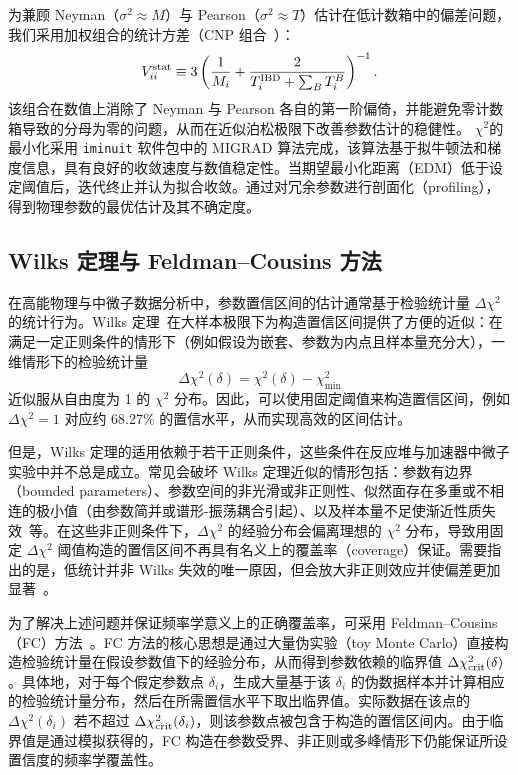 为兼顾 Neyman（$\sigma^2\approx M$）与 Pearson（$\sigma^2\approx T$）估计在低计数箱中的偏差问题，我们采用加权组合的统计方差（CNP 组合~\citep{JI2020163677}）：  
\begin{equation}  
V_{ii}^{\rm stat} \equiv 3\left(\frac{1}{M_i}+\frac{2}{T_i^{\rm IBD}+\sum_B T_i^{B}}\right)^{-1}.  
\label{eq:Chisq:CNP}  
\end{equation}  
该组合在数值上消除了 Neyman 与 Pearson 各自的第一阶偏倚，并能避免零计数箱导致的分母为零的问题，从而在近似泊松极限下改善参数估计的稳健性。
$\chi^2$的最小化采用 \texttt{iminuit} 软件包中的 MIGRAD 算法完成，该算法基于拟牛顿法和梯度信息，具有良好的收敛速度与数值稳定性。当期望最小化距离（EDM）低于设定阈值后，迭代终止并认为拟合收敛。通过对冗余参数进行剖面化（profiling），得到物理参数的最优估计及其不确定度。

\subsection{Wilks 定理与 Feldman–Cousins 方法}
\label{sec:wilks_and_FC}

在高能物理与中微子数据分析中，参数置信区间的估计通常基于检验统计量 $\Delta\chi^2$ 的统计行为。Wilks 定理~\cite{Wilks:1938dza}在大样本极限下为构造置信区间提供了方便的近似：在满足一定正则条件的情形下（例如假设为嵌套、参数为内点且样本量充分大），一维情形下的检验统计量
\begin{equation}
\Delta\chi^2(\delta)=\chi^2(\delta)-\chi^2_{\min}
\label{eq:Delta-chi2}
\end{equation}
近似服从自由度为 1 的 $\chi^2$ 分布。因此，可以使用固定阈值来构造置信区间，例如 $\Delta\chi^2=1$ 对应约 68.27\% 的置信水平，从而实现高效的区间估计。

但是，Wilks 定理的适用依赖于若干正则条件，这些条件在反应堆与加速器中微子实验中并不总是成立。常见会破坏 Wilks 定理近似的情形包括：参数有边界（bounded parameters）、参数空间的非光滑或非正则性、似然面存在多重或不相连的极小值（由参数简并或谱形-振荡耦合引起）、以及样本量不足使渐近性质失效~\cite{Acero2022ProfiledFC,Ogawa1964}等。在这些非正则条件下，$\Delta\chi^2$ 的经验分布会偏离理想的 $\chi^2$ 分布，导致用固定 $\Delta\chi^2$ 阈值构造的置信区间不再具有名义上的覆盖率（coverage）保证。需要指出的是，低统计并非 Wilks 失效的唯一原因，但会放大非正则效应并使偏差更加显著~\cite{Cordeiro1995}。

为了解决上述问题并保证频率学意义上的正确覆盖率，可采用 Feldman–Cousins（FC）方法~\cite{Feldman_1998}。FC 方法的核心思想是通过大量伪实验（toy Monte Carlo）直接构造检验统计量在假设参数值下的经验分布，从而得到参数依赖的临界值 $\Delta\chi^2_{\rm crit}(\delta)$。具体地，对于每个假定参数点 $\delta_i$，生成大量基于该 $\delta_i$ 的伪数据样本并计算相应的检验统计量分布，然后在所需置信水平下取出临界值。实际数据在该点的 $\Delta\chi^2(\delta_i)$ 若不超过 $\Delta\chi^2_{\rm crit}(\delta_i)$，则该参数点被包含于构造的置信区间内。由于临界值是通过模拟获得的，FC 构造在参数受界、非正则或多峰情形下仍能保证所设置信度的频率学覆盖性。

